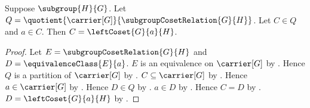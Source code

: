 \begin{lemma}\label{subgroup_coset_block_from_member}
    Suppose $\subgroup{H}{G}$.
    Let
        $Q=\quotient{\carrier[G]}{\subgroupCosetRelation{G}{H}}$.
    Let $C\in Q$ and $a\in C$.
    Then $C=\leftCoset{G}{a}{H}$.
\end{lemma}
\begin{proof}
    Let $E=\subgroupCosetRelation{G}{H}$ and
        $D=\equivalenceClass{E}{a}$.
    $E$ is an equivalence on $\carrier[G]$ by
        .
    Hence $Q$ is a partition of $\carrier[G]$ by
        .
    $C\subseteq\carrier[G]$ by
        .
    Hence $a\in\carrier[G]$ by .
    Hence $D\in Q$ by .
    $a\in D$ by .
    Hence $C=D$ by .
    $D=\leftCoset{G}{a}{H}$ by
        .
\end{proof}

